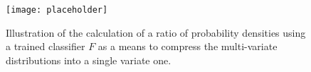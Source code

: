\begin{figure}[t]
  \centering
  \texttt{[image: placeholder]}
  \caption[An illustration of the N--dimensional parametrisation of a shape
  difference between two datasets.]{Illustration of the calculation of a ratio of
    probability densities using a trained classifier $F$ as a means to compress
    the multi-variate distributions into a single variate one.}
  \label{fig:nd-rw-illustration}
\end{figure}